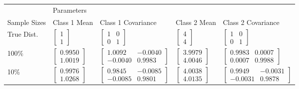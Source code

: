 \documentclass[ 12pt ]{article}
\begin{document}
\begin{enumerate}
\begin{enumerate}
\begin{center}
                \begin{tabular}{|l|llll|}
                    \hline
                    & \multicolumn{4}{l|}{Parameters} \\
                    Sample Sizes & Class 1 Mean & Class 1 Covariance & Class 2 Mean & Class 2 Covariance \\
                    \hline
                    True Dist. & $\begin{bmatrix} 1 \\ 1 \end{bmatrix}$ & $\begin{bmatrix} 1 & 0 \\ 0 & 1 \end{bmatrix}$ & $\begin{bmatrix} 4 \\ 4 \end{bmatrix}$ & $\begin{bmatrix} 1 & 0 \\ 0 & 1 \end{bmatrix}$ \\
                    100\%  & $\begin{bmatrix} 0.9950 \\ 1.0019 \end{bmatrix}$ & $\begin{bmatrix} 1.0092 & -0.0040 \\ -0.0040 & 0.9983 \end{bmatrix}$ & $\begin{bmatrix} 3.9979 \\ 4.0046 \end{bmatrix}$ & $\begin{bmatrix} 0.9983 &  0.0007 \\  0.0007 & 0.9988 \end{bmatrix}$ \\
                    10\%   & $\begin{bmatrix} 0.9976 \\ 1.0268 \end{bmatrix}$ & $\begin{bmatrix} 0.9845 & -0.0085 \\ -0.0085 & 0.9801 \end{bmatrix}$ & $\begin{bmatrix} 4.0038 \\ 4.0135 \end{bmatrix}$ & $\begin{bmatrix} 0.9949 & -0.0031 \\ -0.0031 & 0.9878 \end{bmatrix}$ \\

\end{tabular}
\end{center}
\end{enumerate}
\end{enumerate}
\end{document}
